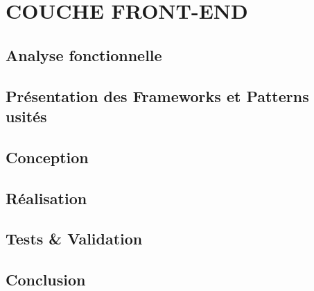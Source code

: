 \setcounter{chapter}{3}
\chapter{COUCHE FRONT-END}
\minitoc %
\graphicspath{{Chapitre4/figures/}}


\pagestyle{fancy}
\fancyhf{}
\fancyhead[R]{\bfseries\rightmark}
\fancyfoot[R]{\thepage}
\renewcommand{\headrulewidth}{0.5pt}
\renewcommand{\footrulewidth}{0pt}
\renewcommand{\chaptermark}[1]{\markboth{\MakeUppercase{\chaptername~\thechapter. #1 }}{}}
\renewcommand{\sectionmark}[1]{\markright{\thechapter.\thesection~ #1}}

\begin{spacing}{1.5}

\section*{Analyse fonctionnelle}



\section{Présentation des Frameworks et Patterns usités}


\section{Conception}


\section{Réalisation}


\section{Tests \& Validation}


\section*{Conclusion}


\end{spacing}
